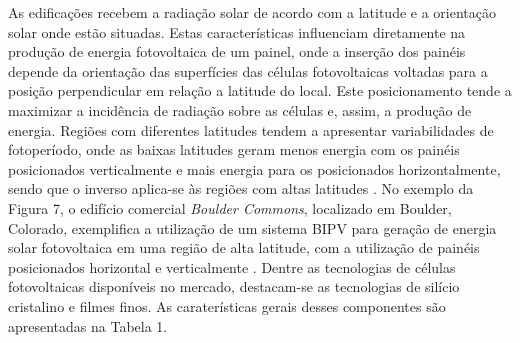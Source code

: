 \begin{onehalfspace}
    \noindent As edificações recebem a radiação solar de acordo com a latitude e a orientação solar onde estão situadas. 
    Estas características influenciam diretamente na produção de energia fotovoltaica de um painel, onde a 
    inserção dos painéis depende da orientação das superfícies das células fotovoltaicas voltadas para a posição 
    perpendicular em relação a latitude do local. Este posicionamento tende a maximizar a incidência de radiação 
    sobre as células e, assim, a produção de energia. Regiões com diferentes latitudes tendem a apresentar 
    variabilidades de fotoperíodo, onde as baixas latitudes geram menos energia com os painéis posicionados 
    verticalmente e mais energia para os posicionados horizontalmente, sendo que o inverso aplica-se às regiões 
    com altas latitudes \cite{Pereira2017}.\vspace{0.3cm} \newline
    No exemplo da Figura 7, o edifício comercial \textit{Boulder Commons}, localizado em Boulder, Colorado, 
    exemplifica a utilização de um sistema BIPV para geração de energia solar fotovoltaica em uma região de 
    alta latitude, com a utilização de painéis posicionados horizontal e verticalmente \cite{AmericanSocietyofHeatingRefrigeratingandAir-ConditioningEngineers-ASHRAE2019,Pereira2017}.
    Dentre as tecnologias de células fotovoltaicas disponíveis no mercado, destacam-se as tecnologias de 
    silício cristalino e filmes finos. As caraterísticas gerais desses componentes são apresentadas na Tabela 1.


        

\end{onehalfspace}
